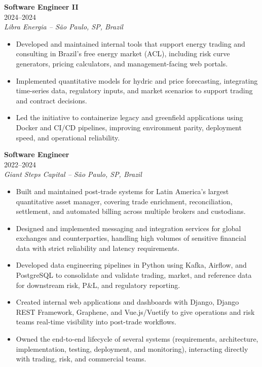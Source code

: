 \documentclass[a4paper,9pt]{extarticle}
\begin{document}
\noindent
\textbf{Software Engineer II} \\
2024--2024 \\
\textit{Libra Energia -- São Paulo, SP, Brazil}
\begin{itemize}[leftmargin=*]
\item Developed and maintained internal tools that support energy trading and consulting in Brazil's free energy market (ACL), including risk curve generators, pricing calculators, and management-facing web portals.
\item Implemented quantitative models for hydric and price forecasting, integrating time-series data, regulatory inputs, and market scenarios to support trading and contract decisions.
\item Led the initiative to containerize legacy and greenfield applications using Docker and CI/CD pipelines, improving environment parity, deployment speed, and operational reliability. \\
\end{itemize}

\noindent
\textbf{Software Engineer} \\
2022--2024 \\
\textit{Giant Steps Capital -- São Paulo, SP, Brazil}
\begin{itemize}[leftmargin=*]
\item Built and maintained post-trade systems for Latin America's largest quantitative asset manager, covering trade enrichment, reconciliation, settlement, and automated billing across multiple brokers and custodians.
\item Designed and implemented messaging and integration services for global exchanges and counterparties, handling high volumes of sensitive financial data with strict reliability and latency requirements.
\item Developed data engineering pipelines in Python using Kafka, Airflow, and PostgreSQL to consolidate and validate trading, market, and reference data for downstream risk, P\&L, and regulatory reporting.
\item Created internal web applications and dashboards with Django, Django REST Framework, Graphene, and Vue.js/Vuetify to give operations and risk teams real-time visibility into post-trade workflows.
\item Owned the end-to-end lifecycle of several systems (requirements, architecture, implementation, testing, deployment, and monitoring), interacting directly with trading, risk, and commercial teams. \\
\end{itemize}
\end{document}
